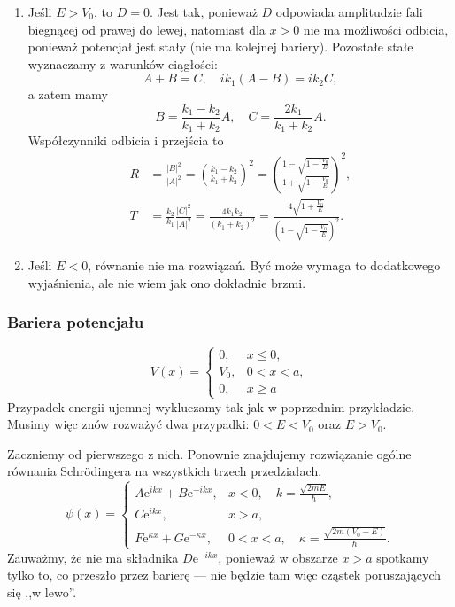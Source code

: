\begin{enumerate}
	\item Jeśli $E > V_0$, to $D = 0$. Jest tak, ponieważ $D$ odpowiada amplitudzie fali biegnącej od prawej do lewej, natomiast dla $x>0$ nie ma możliwości odbicia, ponieważ potencjał jest stały (nie ma kolejnej bariery). Pozostałe stałe wyznaczamy z warunków ciągłości:
	\begin{equation*}
		A + B = C, \quad ik_1 (A - B) = ik_2 C,
	\end{equation*}
	a zatem mamy
	\begin{equation*}
		B = \frac{k_1 - k_2}{k_1 + k_2}A, \quad C = \frac{2k_1 }{k_1 + k_2}A.
	\end{equation*}
	Współczynniki odbicia i przejścia to
	\begin{align*}
		R &= \frac{|B|^2}{|A|^2} = \left(\frac{k_1 - k_2}{k_1 + k_2}\right)^2 = \left(\frac{1 - \sqrt{1 - \frac{V_0}{E}}}{1 + \sqrt{1 - \frac{V_0}{E}}}\right)^2,\\
		T &= \frac{k_2}{k_1}\frac{|C|^2}{|A|^2} = \frac{4k_1k_2}{(k_1 + k_2)^2} = \frac{4\sqrt{1 + \frac{V_0}{E}}}{\left(1 - \sqrt{1 - \frac{V_0}{E}}\right)^2}.
	\end{align*}
	
	\item Jeśli $E < 0$, równanie nie ma rozwiązań. Być może wymaga to dodatkowego wyjaśnienia, ale nie wiem jak ono dokładnie brzmi.
\end{enumerate}

\subsubsection*{Bariera potencjału}
\begin{equation*}
	V(x) = \begin{cases}
		0, &x \leq 0,\\
		V_0, &0<x<a,\\
		0, &x\geq a
	\end{cases}
\end{equation*}
Przypadek energii ujemnej wykluczamy tak jak w poprzednim przykładzie. Musimy więc znów rozważyć dwa przypadki: $0<E<V_0$ oraz $E>V_0$.

Zaczniemy od pierwszego z nich. Ponownie znajdujemy rozwiązanie ogólne równania Schrödingera na wszystkich trzech przedziałach.
\begin{equation*}
	\psi(x) = \begin{cases}
		A\mathrm{e}^{ikx} + B\mathrm{e}^{-ikx}, &x<0, \quad k = \frac{\sqrt{2mE}}{\hbar},\\
		C\mathrm{e}^{ikx}, & x>a,\\
		F\mathrm{e}^{\kappa x} + G\mathrm{e}^{-\kappa x}, &0<x<a, \quad \kappa = \frac{\sqrt{2m(V_0 - E)}}{\hbar}.
	\end{cases}
\end{equation*}
Zauważmy, że nie ma składnika $D\mathrm{e}^{-ikx}$, ponieważ w obszarze $x>a$ spotkamy tylko to, co przeszło przez barierę --- nie będzie tam więc cząstek poruszających się ,,w lewo''.

